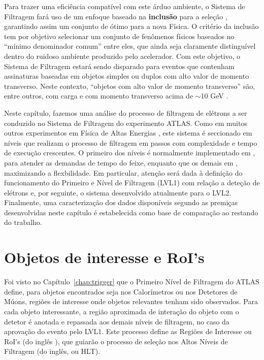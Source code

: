 Para trazer uma eficiência compatível com este árduo ambiente, o Sistema de
Filtragem fará uso de um enfoque baseado na \textbf{inclusão} para a seleção
, garantindo assim um conjunto de  ótimo para a nova
Física. O critério da inclusão tem por objetivo selecionar um conjunto de
fenômenos físicos baseados no ``mínimo denominador comum'' entre eles, que
ainda seja claramente distinguível dentro do ruidoso ambiente produzido pelo
acelerador. Com este objetivo, o Sistema de Filtragem estará sendo disparado
para eventos que contenham assinaturas baseadas em objetos simples ou duplos
com alto valor de momento transverso. Neste contexto, ``objetos com alto valor
de momento transverso'' são, entre outros,  com carga e com
momento transverso acima de $\sim$10 GeV \cite{hlt-tdr}.

Neste capítulo, fazemos uma análise do processo de filtragem de elétrons a ser
conduzido no Sistema de Filtragem do experimento ATLAS. Como em muitos outros
experimentos em Física de Altas Energias \cite{abolins-calor-2000,
monteiro-calor-1999}, este sistema é seccionado em níveis que realizam o
processo de filtragem em passos com complexidade e tempo de execução
crescentes. O primeiro dos níveis é normalmente implementado em
, para atender as demandas de tempo do feixe, enquanto que os
demais em , maximizando a flexbilidade. Em particular, atenção
será dada à definição do funcionamento do Primeiro e Nível de Filtragem (LVL1)
com relação a deteção de elétrons e, por seguinte, o sistema desenvolvido
atualmente para o LVL2. Finalmente, uma caracterização dos dados disponíveis
segundo as premiças desenvolvidas neste capítulo é estabelecida como base de
comparação ao restando do trabalho.

\section{Objetos de interesse e RoI's}

Foi visto no Capítulo~\ref{chap:trigger} que o Primeiro Nível de Filtragem do
ATLAS define, para objetos encontrados seja nos Calorímetros ou nos Detetores
de Múons, regiões de interesse onde objetos relevantes tenham sido
observados. Para cada objeto interessante, a região aproximada de interação do
objeto com o detetor é anotada e repassada aos demais níveis de filtragem, no
caso da aprovação do evento pelo LVL1. Este processo define as Regiões de
Interesse ou RoI's (do inglês ), que guiarão o
processo de seleção nos Altos Níveis de Filtragem (do inglês,  ou HLT).


